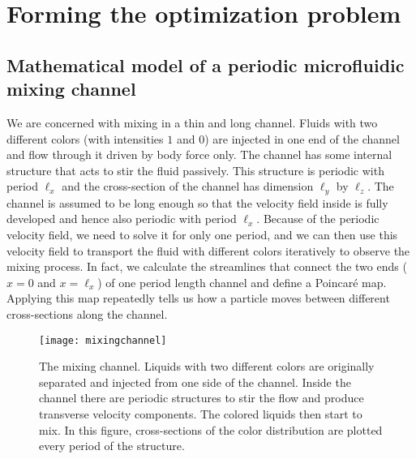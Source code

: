 %
%
\section{Forming the optimization problem}
\label{sec:opt}

\subsection{Mathematical model of a periodic microfluidic mixing channel}


We are concerned with mixing in a thin and long channel. Fluids with
two different colors (with intensities $1$ and $0$) are injected in
one end of the channel and flow through it driven by body force
only. The channel has some internal structure that acts to stir the
fluid passively. This structure is periodic with period $\ell_x$ and the
cross-section of the channel has dimension $\ell_y$ by $\ell_z$. The channel
is assumed to be long enough so that the velocity field inside is
fully developed and hence also periodic with period $\ell_x$. Because of the
periodic velocity field, we need to solve it for only one period, and
we can then use this velocity field to transport the fluid with
different colors iteratively to observe the mixing process. In fact,
we calculate the streamlines that connect the two ends ($x=0$ and
$x=\ell_x$) of one period length channel and define a Poincar\'e
map. Applying this map repeatedly tells us how a particle moves
between different cross-sections along the channel.



\begin{figure}
  \centerline{
    \texttt{[image: mixingchannel]}}
  \caption{\label{mixingchannel} The mixing channel. Liquids with two
    different colors are originally separated and injected from one
    side of the channel. Inside the channel there are periodic
    structures to stir the flow and produce transverse velocity
    components. The colored liquids then start to mix. In this figure,
    cross-sections of the color distribution are plotted every period
    of the structure.}
\end{figure}


